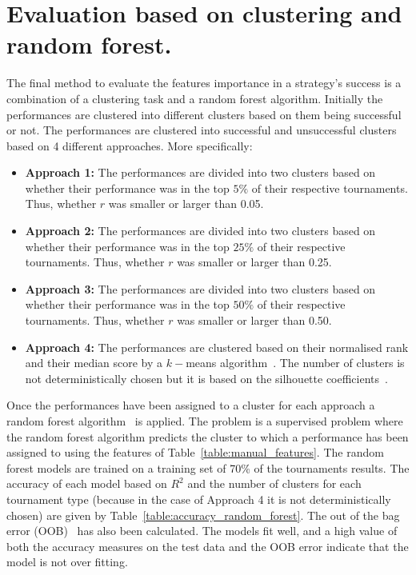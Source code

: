\section{Evaluation based on clustering and random forest.}\label{app:clustering}

The final method to evaluate the features importance in a strategy's success
is a combination of a clustering task and a random forest algorithm.
Initially the performances are clustered into different clusters
based on them being successful or not. The performances are clustered into
successful and unsuccessful clusters based on 4 different approaches.
More specifically:

\begin{itemize}
    \item \textbf{Approach 1:} The performances are divided into two clusters based
    on whether their performance was in the top \(5\%\) of their respective tournaments.
    Thus, whether \(r\) was smaller or larger than 0.05.
    \item \textbf{Approach 2:} The performances are divided into two clusters based
    on whether their performance was in the top \(25\%\) of their respective tournaments.
    Thus, whether \(r\) was smaller or larger than 0.25.
    \item \textbf{Approach 3:} The performances are divided into two clusters based
    on whether their performance was in the top \(50\%\) of their respective tournaments.
    Thus, whether \(r\) was smaller or larger than 0.50.
    \item \textbf{Approach 4:} The performances are clustered based on their normalised rank and
    their median score by a \(k-\)means algorithm~\cite{Arthur2007}. The number of
    clusters is not deterministically chosen but it is based on the silhouette
    coefficients~\cite{Rousseeuw1987}.
\end{itemize}

Once the performances have been assigned to a cluster for each approach a
random forest algorithm~\cite{breiman2001} is applied. The problem is a supervised
problem where the random forest algorithm predicts the cluster to which a performance
has been assigned to using the features of Table~\ref{table:manual_features}.
The random
forest models are trained on a training set of 70\% of the tournaments results.
The accuracy of each model based on $R^2$ and the number of clusters for each
tournament type (because in the case of Approach 4 it is not
deterministically chosen) are given by Table~\ref{table:accuracy_random_forest}.
The out of the bag error (OOB)~\cite{hastie2005} has also been calculated. The
models fit well, and a high value of both the accuracy measures on the test data
and the OOB error indicate that the model is not over fitting.

